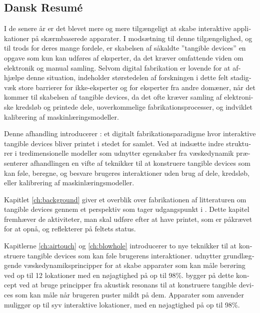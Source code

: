 		\begin{otherlanguage}{danish}
			\chapter*{Dansk Resum\'e}
				I de senere år er det blevet mere og mere tilgængeligt at skabe
				interaktive applikationer på skærmbaserede apparater. I modsætning til
				denne tilgængelighed, og til trods for deres mange fordele, er skabelsen
				af såkaldte ”tangible devices” en opgave som kun kan udføres af eksperter,
				da det kræver omfattende viden om elektronik og manual samling. Selvom
				digital fabrikation er lovende for at afhjælpe denne situation, indeholder
				størstedelen af forskningen i dette felt stadigvæk store barrierer for
				ikke-eksperter og for eksperter fra andre domæner, når det kommer til
				skabelsen af tangible devices, da det ofte kræver samling af elektroniske
				kredsløb og printede dele, uoverkommelige fabrikationsprocesser, og
				indviklet kalibrering af maskinlæringsmodeller.
				
				Denne afhandling introducerer \emph{\papf}: et digitalt
				fabrikationsparadigme hvor interaktive tangible devices bliver printet i
				stedet for samlet. Ved at indsætte indre strukturer i tredimensionelle
				modeller som udnytter egenskaber fra væskedynamik præsenterer afhandlingen
				en vifte af teknikker til at konstruere tangible devices som kan føle,
				beregne, og besvare brugeres interaktioner uden brug af dele, kredsløb,
				eller kalibrering af maskinlæringsmodeller.
				
				Kapitlet \ref{ch:background} giver et overblik over fabrikationen af
				litteraturen om tangible devices gennem et perspektiv som tager
				udgangspunkt i \emph{\papf}. Dette kapitel fremhæver de aktiviteter, man
				skal udføre efter at have printet, som er påkrævet for at opnå, og
				reflekterer på feltets status.
				
				Kapitlerne \ref{ch:airtouch} og \ref{ch:blowhole} introducerer to nye
				teknikker til at konstruere tangible devices som kan føle brugerens
				interaktioner. \at udnytter grundlæggende væskedynamiksprincipper for at
				skabe apparater som kan måle berøring ved op til 12 lokationer med en
				nøjagtighed på op til 98\%. \bh bygger på dette koncept ved at bruge
				principper fra akustisk resonans til at konstruere tangible devices som
				kan måle når brugeren puster mildt på dem. Apparater som anvender \bh
				muliggør op til syv interaktive lokationer, med en nøjagtighed på op til
				98\%.
				

\end{otherlanguage}
